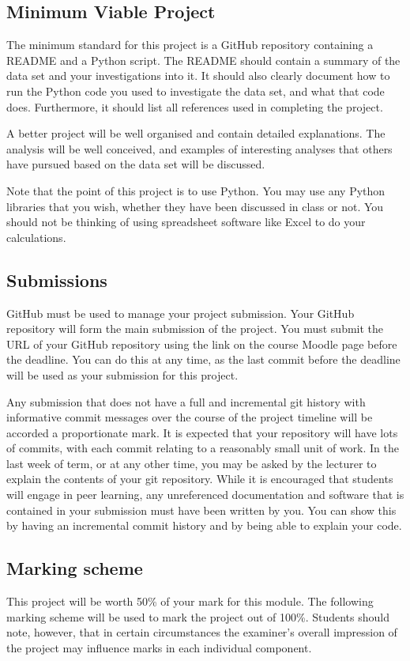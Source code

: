 \documentclass[12pt, a4paper, hidelinks]{scrartcl}
\begin{document}
\subsection*{Minimum Viable Project}
  The minimum standard for this project is a GitHub repository containing a README and a Python script.
  The README should contain a summary of the data set and your investigations into it.
  It should also clearly document how to run the Python code you used to investigate the data set, and what that code does.
  Furthermore, it should list all references used in completing the project.

  A better project will be well organised and contain detailed explanations.
  The analysis will be well conceived, and examples of interesting analyses that others have pursued based on the data set will be discussed.
  
  Note that the point of this project is to use Python.
  You may use any Python libraries that you wish, whether they have been discussed in class or not.
  You should not be thinking of using spreadsheet software like Excel to do your calculations.

\subsection*{Submissions}
  GitHub must be used to manage your project submission.
  Your GitHub repository will form the main submission of the project.
  You must submit the URL of your GitHub repository using the link on the course Moodle page before the deadline.
  You can do this at any time, as the last commit before the deadline will be used as your submission for this project.

  Any submission that does not have a full and incremental git history with informative commit messages over the course of the project timeline will be accorded a proportionate mark.
  It is expected that your repository will have lots of commits, with each commit relating to a reasonably small unit of work.
  In the last week of term, or at any other time, you may be asked by the lecturer to explain the contents of your git repository.
  While it is encouraged that students will engage in peer learning, any unreferenced documentation and software that is contained in your submission must have been written by you.
  You can show this by having an incremental commit history and by being able to explain your code.

\subsection*{Marking scheme}
  This project will be worth 50\% of your mark for this module.
  The following marking scheme will be used to mark the project out of 100\%.
  Students should note, however, that in certain circumstances the examiner's overall impression of the project may influence marks in each individual component.
\end{document}
